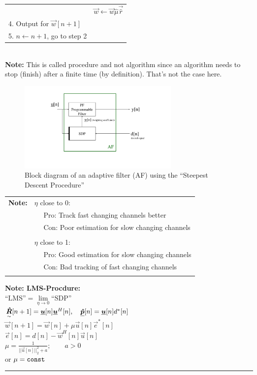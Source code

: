 \begin{doublespace}
{\begin{tabular}{ll}
	&$\vec{w}\leftarrow\vec{w}\hat{\mu}\vec{\hat{r}}$\\
	4. Output \vec{w} for $\vec{w}[n+1]$&\\
	5. $n\leftarrow n+1$, go to step 2&\\
\end{tabular}}\\
\textbf{Note:} This is called procedure and not algorithm since an algorithm needs to stop (finish) after a finite time (by definition). That's not the case here.\\
\begin{figure}[H]
	\centering
		\includegraphics[trim =4cm 3cm 4cm 1cm, clip, width=0.70\textwidth]{graphics/adaptive_filter_with_SDP.pdf}
	\caption{Block diagram of an adaptive filter (AF) using the ``Steepest Descent Procedure''}
	\label{fig:adaptive_filter_with_SDP}
\end{figure}

\begin{tabular}{ll}
\textbf{Note:}&$\eta$ close to 0:\\
&$\quad$ Pro: Track fast changing channels better\\
&$\quad$ Con: Poor estimation for slow changing channels\\
&\\
&$\eta$ close to 1:\\
&$\quad$ Pro: Good estimation for slow changing channels\\
&$\quad$ Con: Bad tracking of fast changing channels\\
&\\
\end{tabular}

\textbf{Note: LMS-Procdure:}\\
$\text{``LMS''}=\lim\limits_{\eta\rightarrow 0}\text{``SDP''}$\\
$\underset{\sim}{\boldsymbol {\hat{R}}}[n+1]=\underline{\boldsymbol {u}}[n]\underline{\boldsymbol {u}}^H[n], \quad \underline{\boldsymbol {\hat{p}}}[n]=\underline{\boldsymbol {u}}[n]d^*[n]$\\
$\vec{w}[n+1]=\vec{w}[n]+\mu\vec{u}[n]\vec{e}^*[n]$\\
$\vec{e}[n]=d[n]-\vec{w}^H[n]\vec{u}[n]$\\
$\mu=\frac{1}{||\vec{u}[n]||_2^2+a};\qquad a>0$\\
or $\mu=\texttt{const}$\\
\rule{\textwidth}{0.4pt}


\end{doublespace}
